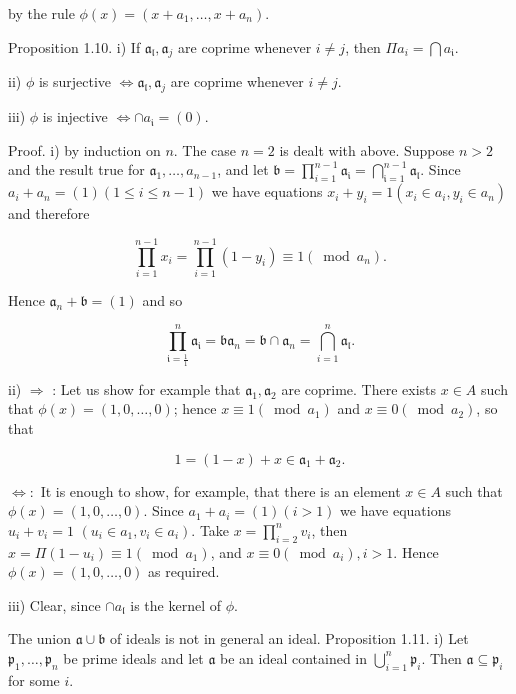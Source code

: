 \documentclass{standalone}
\theoremstyle{definition}
\theoremstyle{remark}
\begin{document}
by the rule $\phi(x)=\left(x+a_{1}, \ldots, x+a_{n}\right)$.

Proposition 1.10. i) If $\mathfrak{a}_{\mathfrak{l}}, \mathfrak{a}_{j}$ are coprime whenever $i \neq j$, then $\Pi a_{i}=\bigcap a_{\mathfrak{i}}$.

ii) $\phi$ is surjective $\Leftrightarrow \mathfrak{a}_{\mathfrak{l}}, \mathfrak{a}_{j}$ are coprime whenever $i \neq j$.

iii) $\phi$ is injective $\Leftrightarrow \cap a_{\mathfrak{i}}=(0)$.

Proof. i) by induction on $n$. The case $n=2$ is dealt with above. Suppose $n>2$ and the result true for $\mathfrak{a}_{1}, \ldots, a_{n-1}$, and let $\mathfrak{b}=\prod_{i=1}^{n-1} \mathfrak{a}_{\mathfrak{i}}=\bigcap_{\mathfrak{i}=1}^{n-1} \mathfrak{a}_{\mathfrak{l}}$. Since $a_{i}+a_{n}=(1)(1 \leqslant i \leqslant n-1)$ we have equations $x_{i}+y_{i}=1\left(x_{i} \in a_{i}, y_{i} \in a_{n}\right)$ and therefore

\[
\prod_{i=1}^{n-1} x_{i}=\prod_{i=1}^{n-1}\left(1-y_{i}\right) \equiv 1\left(\bmod a_{n}\right) .
\]

Hence $\mathfrak{a}_{n}+\mathfrak{b}=(1)$ and so

\[
\prod_{\mathfrak{i}=\frac{1}{1}}^{n} \mathfrak{a}_{\mathfrak{i}}=\mathfrak{b} \mathfrak{a}_{n}=\mathfrak{b} \cap \mathfrak{a}_{n}=\bigcap_{i=1}^{n} \mathfrak{a}_{\mathfrak{l}} .
\]

ii) $\Rightarrow$ : Let us show for example that $\mathfrak{a}_{1}, \mathfrak{a}_{2}$ are coprime. There exists $x \in A$ such that $\phi(x)=(1,0, \ldots, 0)$; hence $x \equiv 1\left(\bmod a_{1}\right)$ and $x \equiv 0\left(\bmod a_{2}\right)$, so that

\[
1=(1-x)+x \in \mathfrak{a}_{1}+\mathfrak{a}_{2} .
\]

$\Leftrightarrow:$ It is enough to show, for example, that there is an element $x \in A$ such that $\phi(x)=(1,0, \ldots, 0)$. Since $a_{1}+a_{i}=(1)(i>1)$ we have equations $u_{i}+v_{i}=1$ $\left(u_{i} \in a_{1}, v_{i} \in a_{i}\right)$. Take $x=\prod_{i=2}^{n} v_{i}$, then $x=\Pi\left(1-u_{i}\right) \equiv 1\left(\bmod a_{1}\right)$, and $x \equiv 0\left(\bmod a_{i}\right), i>1$. Hence $\phi(x)=(1,0, \ldots, 0)$ as required.

iii) Clear, since $\cap a_{\mathfrak{l}}$ is the kernel of $\phi$.

The union $\mathfrak{a} \cup \mathfrak{b}$ of ideals is not in general an ideal. Proposition 1.11. i) Let $\mathfrak{p}_{1}, \ldots, \mathfrak{p}_{n}$ be prime ideals and let $\mathfrak{a}$ be an ideal contained in $\bigcup_{i=1}^{n} \mathfrak{p}_{i}$. Then $\mathfrak{a} \subseteq \mathfrak{p}_{i}$ for some $i$.
\end{document}
